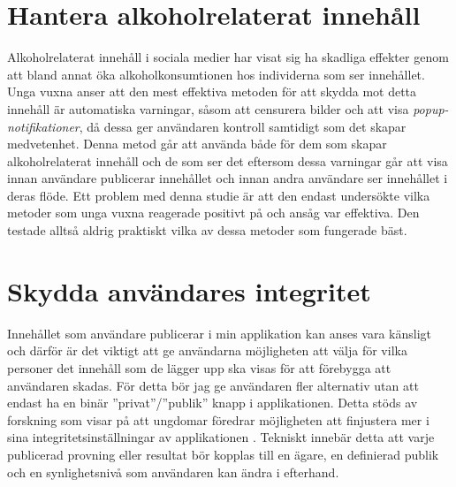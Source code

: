 \documentclass{TDP003mall}
\begin{document}
\section{Hantera alkoholrelaterat innehåll}
Alkoholrelaterat innehåll i sociala medier har visat sig ha skadliga effekter genom att bland annat öka alkoholkonsumtionen hos individerna som ser innehållet. Unga vuxna anser att den mest effektiva metoden för att skydda mot detta innehåll är automatiska varningar, såsom att censurera bilder och att visa \textit{popup-notifikationer}, då dessa ger användaren kontroll samtidigt som det skapar medvetenhet. Denna metod går att använda både för dem som skapar alkoholrelaterat innehåll och de som ser det eftersom dessa varningar går att visa innan användare publicerar innehållet och innan andra användare ser innehållet i deras flöde. Ett problem med denna studie är att den endast undersökte vilka metoder som unga vuxna reagerade positivt på och ansåg var effektiva. Den testade alltså aldrig praktiskt vilka av dessa metoder som fungerade bäst. \cite{hendriks_dealing_2023}

\section{Skydda användares integritet}
Innehållet som användare publicerar i min applikation kan anses vara känsligt och därför är det viktigt att ge användarna möjligheten att välja för vilka personer det innehåll som de lägger upp ska visas för att förebygga att användaren skadas. För detta bör jag ge användaren fler alternativ utan att endast ha en binär ''privat''/''publik'' knapp i applikationen. Detta stöds av forskning som visar på att ungdomar föredrar möjligheten att finjustera mer i sina integritetsinställningar av applikationen \cite{vanherle_only_2023}. Tekniskt innebär detta att varje publicerad provning eller resultat bör kopplas till en ägare, en definierad publik och en synlighetsnivå som användaren kan ändra i efterhand.



\end{document}
